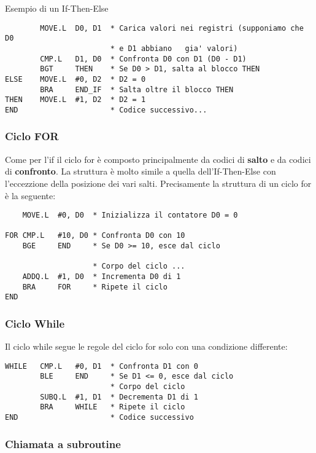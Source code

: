 Esempio di un If-Then-Else
\begin{lstlisting}
        MOVE.L  D0, D1  * Carica valori nei registri (supponiamo che D0 
                        * e D1 abbiano   gia' valori)
        CMP.L   D1, D0  * Confronta D0 con D1 (D0 - D1)
        BGT     THEN    * Se D0 > D1, salta al blocco THEN
ELSE    MOVE.L  #0, D2  * D2 = 0
        BRA     END_IF  * Salta oltre il blocco THEN 
THEN    MOVE.L  #1, D2  * D2 = 1
END                     * Codice successivo...
\end{lstlisting}


\subsubsection{Ciclo FOR}
Come per l'if il ciclo for è composto principalmente da codici di \textbf{salto} e da codici di \textbf{confronto}. La struttura è molto simile a quella dell'If-Then-Else con l'eccezzione della posizione dei vari salti.
Precisamente la struttura di un ciclo for è la seguente:
\begin{lstlisting}
    MOVE.L  #0, D0  * Inizializza il contatore D0 = 0

FOR CMP.L   #10, D0 * Confronta D0 con 10
    BGE     END     * Se D0 >= 10, esce dal ciclo

                    * Corpo del ciclo ...
    ADDQ.L  #1, D0  * Incrementa D0 di 1
    BRA     FOR     * Ripete il ciclo
END                 

\end{lstlisting}

\subsubsection{Ciclo While}

Il ciclo while segue le regole del ciclo for solo con una condizione differente:
\begin{lstlisting}
WHILE   CMP.L   #0, D1  * Confronta D1 con 0
        BLE     END     * Se D1 <= 0, esce dal ciclo
                        * Corpo del ciclo
        SUBQ.L  #1, D1  * Decrementa D1 di 1
        BRA     WHILE   * Ripete il ciclo
END                     * Codice successivo
\end{lstlisting}


\subsubsection{Chiamata a subroutine}

